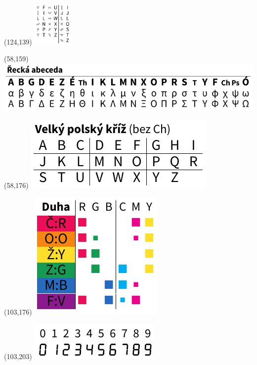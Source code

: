 \documentclass{extarticle}
\begin{document}
\begin{textblock}{0}(124,139)%
\vfill
{\includegraphics[width=20mm]{tools/xmino.pdf}}
\vfill
\end{textblock}

\begin{textblock}{0}(58,159)%
  \vfill
  {\includegraphics[scale=0.7]{tools/greek.pdf}}
  \vfill
  \end{textblock}

\begin{textblock}{0}(58,176)%
\vfill
{\includegraphics[scale=0.7]{tools/rosicrucian-polish-v2.pdf}}
\vfill
\end{textblock}

\begin{textblock}{0}(103,176)%
\vfill
{\includegraphics[scale=0.7]{tools/rainbow-v2.pdf}}
\vfill
\end{textblock}

\begin{textblock}{0}(103,203)%
\vfill
{\includegraphics[scale=0.7]{tools/digits.pdf}}
\vfill
\end{textblock}
\end{document}
